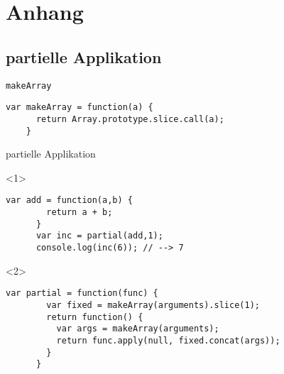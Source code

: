 \appendix

\section{Anhang}

\subsection{partielle Applikation}

\begin{frame}[fragile]{\lstinline-makeArray-}
  \begin{lstlisting}[gobble=4]
    var makeArray = function(a) {
      return Array.prototype.slice.call(a);
    }
  \end{lstlisting}  
\end{frame}

\begin{frame}[fragile]{partielle Applikation}
  \begin{onlyenv}<1>
    \begin{lstlisting}[gobble=6]
      var add = function(a,b) {
        return a + b;
      }
      var inc = partial(add,1);
      console.log(inc(6)); // --> 7
    \end{lstlisting}
  \end{onlyenv}
  
  \begin{onlyenv}<2>
    \begin{lstlisting}[gobble=6]
      var partial = function(func) {
        var fixed = makeArray(arguments).slice(1);
        return function() {
          var args = makeArray(arguments);
          return func.apply(null, fixed.concat(args));
        }
      }
    \end{lstlisting}
  \end{onlyenv}
\end{frame}

